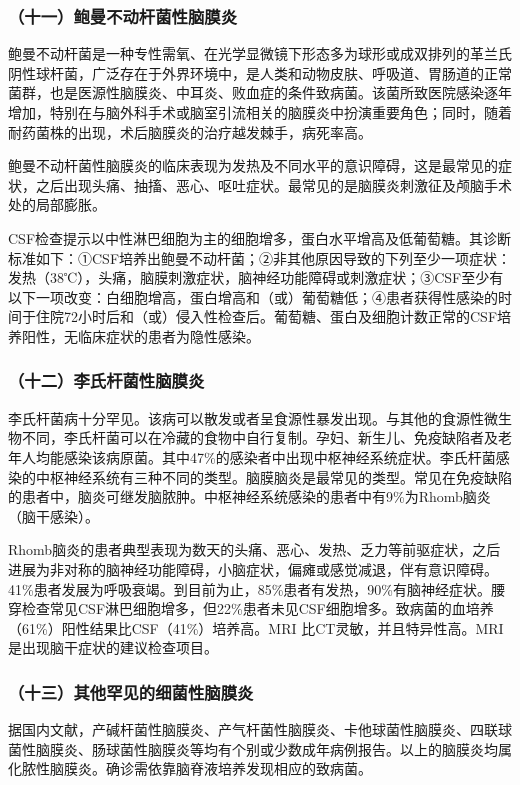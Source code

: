 \subsubsection{（十一）鲍曼不动杆菌性脑膜炎}

鲍曼不动杆菌是一种专性需氧、在光学显微镜下形态多为球形或成双排列的革兰氏阴性球杆菌，广泛存在于外界环境中，是人类和动物皮肤、呼吸道、胃肠道的正常菌群，也是医源性脑膜炎、中耳炎、败血症的条件致病菌。该菌所致医院感染逐年增加，特别在与脑外科手术或脑室引流相关的脑膜炎中扮演重要角色；同时，随着耐药菌株的出现，术后脑膜炎的治疗越发棘手，病死率高。

鲍曼不动杆菌性脑膜炎的临床表现为发热及不同水平的意识障碍，这是最常见的症状，之后出现头痛、抽搐、恶心、呕吐症状。最常见的是脑膜炎刺激征及颅脑手术处的局部膨胀。

CSF检查提示以中性淋巴细胞为主的细胞增多，蛋白水平增高及低葡萄糖。其诊断标准如下：①CSF培养出鲍曼不动杆菌；②非其他原因导致的下列至少一项症状：发热（38℃），头痛，脑膜刺激症状，脑神经功能障碍或刺激症状；③CSF至少有以下一项改变：白细胞增高，蛋白增高和（或）葡萄糖低；④患者获得性感染的时间于住院72小时后和（或）侵入性检查后。葡萄糖、蛋白及细胞计数正常的CSF培养阳性，无临床症状的患者为隐性感染。

\subsubsection{（十二）李氏杆菌性脑膜炎}

李氏杆菌病十分罕见。该病可以散发或者呈食源性暴发出现。与其他的食源性微生物不同，李氏杆菌可以在冷藏的食物中自行复制。孕妇、新生儿、免疫缺陷者及老年人均能感染该病原菌。其中47\%的感染者中出现中枢神经系统症状。李氏杆菌感染的中枢神经系统有三种不同的类型。脑膜脑炎是最常见的类型。常见在免疫缺陷的患者中，脑炎可继发脑脓肿。中枢神经系统感染的患者中有9\%为Rhomb脑炎（脑干感染）。

Rhomb脑炎的患者典型表现为数天的头痛、恶心、发热、乏力等前驱症状，之后进展为非对称的脑神经功能障碍，小脑症状，偏瘫或感觉减退，伴有意识障碍。41\%患者发展为呼吸衰竭。到目前为止，85\%患者有发热，90\%有脑神经症状。腰穿检查常见CSF淋巴细胞增多，但22\%患者未见CSF细胞增多。致病菌的血培养（61\%）阳性结果比CSF（41\%）培养高。MRI
比CT灵敏，并且特异性高。MRI是出现脑干症状的建议检查项目。

\subsubsection{（十三）其他罕见的细菌性脑膜炎}

据国内文献，产碱杆菌性脑膜炎、产气杆菌性脑膜炎、卡他球菌性脑膜炎、四联球菌性脑膜炎、肠球菌性脑膜炎等均有个别或少数成年病例报告。以上的脑膜炎均属化脓性脑膜炎。确诊需依靠脑脊液培养发现相应的致病菌。

